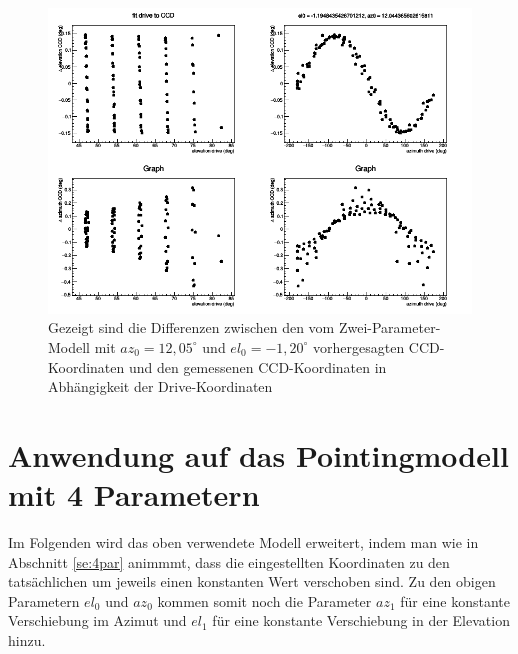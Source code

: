 \begin{figure}[htbp]
\centering

\includegraphics[width=\textwidth]{../341/run341D2C.png}
\caption{Gezeigt sind die Differenzen zwischen den vom Zwei-Parameter-Modell mit $az_0=12,05^{\circ}$ und $el_0=-1,20^{\circ}$ vorhergesagten CCD-Koordinaten und den gemessenen CCD-Koordinaten in Abhängigkeit der Drive-Koordinaten}
\label{img:D2C}
\end{figure}

\section{Anwendung auf das Pointingmodell mit 4 Parametern}
Im Folgenden wird das oben verwendete Modell erweitert, indem man wie in Abschnitt \ref{se:4par} animmmt, dass die eingestellten Koordinaten zu den tatsächlichen um jeweils einen konstanten Wert verschoben sind. Zu den obigen Parametern $el_0$ und $az_0$ kommen somit noch die Parameter $az_1$ für eine konstante Verschiebung im Azimut und $el_1$ für eine konstante Verschiebung in der Elevation hinzu.
